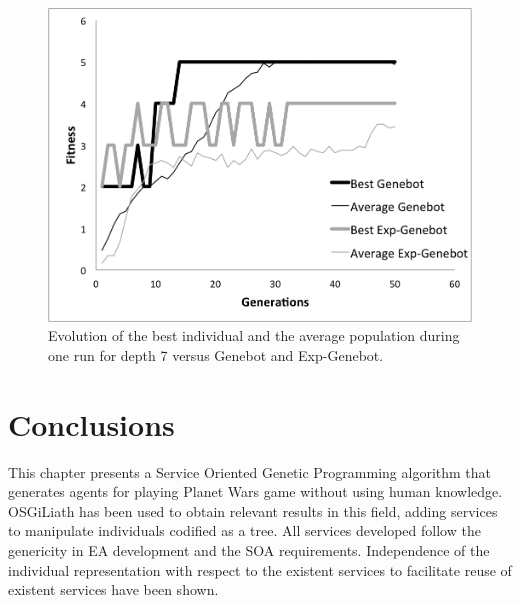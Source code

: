 \begin{figure}
\centering
\includegraphics[scale =0.60] {gfx/rts/generations.png}
\caption{Evolution of the best individual and the average population during one run for depth 7 versus Genebot and Exp-Genebot.}
\label{fig:gens}
\end{figure}
 
\section{Conclusions}
\label{sec:conclusion}

This chapter presents a Service Oriented Genetic Programming algorithm that generates
agents for playing Planet Wars game without using human knowledge. OSGiLiath has been used to obtain relevant results in this field, adding services to manipulate individuals codified as a tree. All services developed follow the genericity in EA development and the SOA requirements. Independence of the individual representation with respect to the existent services to facilitate reuse of existent services have been shown. 





